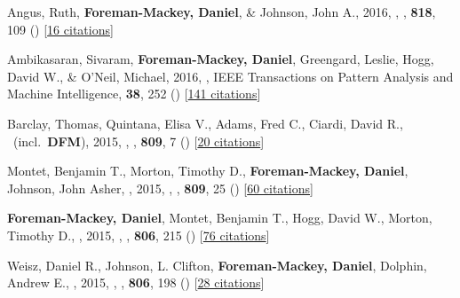\item[{\color{numcolor}\scriptsize15}] Angus, Ruth, \textbf{Foreman-Mackey, Daniel}, \& Johnson, John A., 2016, , \apj, \textbf{818}, 109 () [\href{http://adsabs.harvard.edu/abs/2016ApJ...818..109A}{16 citations}]

\item[{\color{numcolor}\scriptsize14}] Ambikasaran, Sivaram, \textbf{Foreman-Mackey, Daniel}, Greengard, Leslie, Hogg, David W., \& O'Neil, Michael, 2016, , IEEE Transactions on Pattern Analysis and Machine Intelligence, \textbf{38}, 252 () [\href{https://scholar.google.com/scholar?cites=4840899390891567426,9641158393712381489}{141 citations}]

\item[{\color{numcolor}\scriptsize13}] Barclay, Thomas, Quintana, Elisa V., Adams, Fred C., Ciardi, David R., \etal\ (incl.\ \textbf{DFM}), 2015, , \apj, \textbf{809}, 7 () [\href{http://adsabs.harvard.edu/abs/2015ApJ...809....7B}{20 citations}]

\item[{\color{numcolor}\scriptsize12}] Montet, Benjamin T., Morton, Timothy D., \textbf{Foreman-Mackey, Daniel}, Johnson, John Asher, \etal, 2015, , \apj, \textbf{809}, 25 () [\href{http://adsabs.harvard.edu/abs/2015ApJ...809...25M}{60 citations}]

\item[{\color{numcolor}\scriptsize11}] \textbf{Foreman-Mackey, Daniel}, Montet, Benjamin T., Hogg, David W., Morton, Timothy D., \etal, 2015, , \apj, \textbf{806}, 215 () [\href{http://adsabs.harvard.edu/abs/2015ApJ...806..215F}{76 citations}]

\item[{\color{numcolor}\scriptsize10}] Weisz, Daniel R., Johnson, L. Clifton, \textbf{Foreman-Mackey, Daniel}, Dolphin, Andrew E., \etal, 2015, , \apj, \textbf{806}, 198 () [\href{http://adsabs.harvard.edu/abs/2015ApJ...806..198W}{28 citations}]

